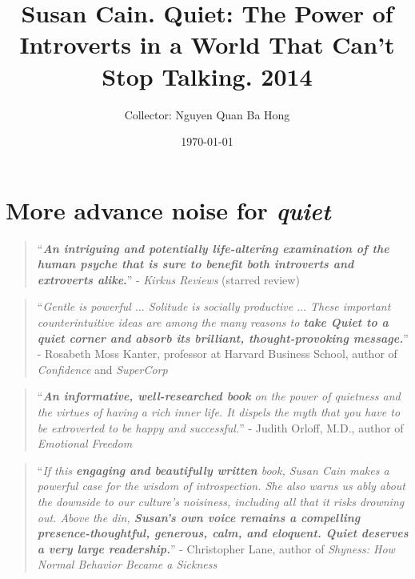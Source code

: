 \documentclass{book}
\title{Susan Cain. Quiet: The Power of Introverts in a World That Can't Stop Talking. 2014}
\author{Collector: Nguyen Quan Ba Hong}
\date{\today}
\numberwithin{equation}{section}
\begin{document}
\maketitle
\setcounter{secnumdepth}{6}
\setcounter{tocdepth}{6}
\tableofcontents


\section*{More advance noise for \textit{quiet}}

\begin{quotation}
    ``\textbf{\textit{An intriguing and potentially life-altering examination of the human psyche that is sure to benefit both introverts and extroverts alike}.}'' - \textit{Kirkus Reviews} (starred review)
\end{quotation}

\begin{quotation}
    ``\textit{Gentle is powerful $\ldots$ Solitude is socially productive $\ldots$ These important counterintuitive ideas are among the many reasons to \textbf{take \emph{Quiet} to a quiet corner and absorb its brilliant, thought-provoking message.}}'' - Rosabeth Moss Kanter, professor at Harvard Business School, author of \textit{Confidence} and \textit{SuperCorp}
\end{quotation}

\begin{quotation}
    ``\textit{\textbf{An informative, well-researched book} on the power of quietness and the virtues of having a rich inner life. It dispels the myth that you have to be extroverted to be happy and successful.}'' - Judith Orloff, M.D., author of \textit{Emotional Freedom}
\end{quotation}

\begin{quotation}
    ``\textit{If this \textbf{engaging and beautifully written} book, Susan Cain makes a powerful case for the wisdom of introspection. She also warns us ably about the downside to our culture's noisiness, including all that it risks drowning out. Above the din, \textbf{Susan's own voice remains a compelling presence-thoughtful, generous, calm, and eloquent. \emph{Quiet} deserves a very large readership.}}'' - Christopher Lane, author of \textit{Shyness: How Normal Behavior Became a Sickness}
\end{quotation}
\end{document}
